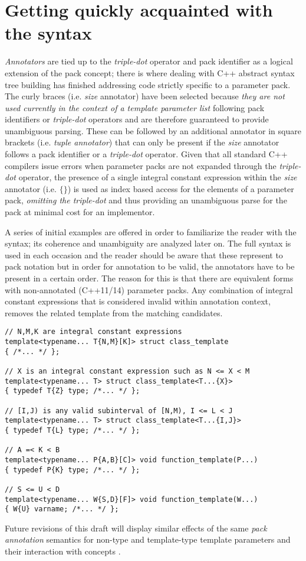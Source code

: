 \section{Getting quickly acquainted with the syntax}
\p \textit{Annotators} are tied up to the \textit{triple-dot} operator and pack identifier as a logical extension of the pack concept; there is where dealing with C++ abstract syntax tree building has finished addressing code strictly specific to a parameter pack.
The curly braces (i.e. \textit{size} annotator) have been selected because \textit{they are not used currently in the context of a template parameter list} following pack identifiers or \textit{triple-dot} operators and are therefore guaranteed to provide unambiguous parsing.
These can be followed by an additional annotator in square brackets (i.e. \textit{tuple annotator}) that can only be present if the \textit{size} annotator follows a pack identifier or a \textit{triple-dot} operator.
Given that all standard C++ compilers issue errors when parameter packs are not expanded through the \textit{triple-dot} operator, the presence of a single integral constant expression within the \textit{size} annotator (i.e. $\{\}$) is used as index based access for the elements of a parameter pack, \textit{omitting the triple-dot} and thus providing an unambiguous parse for the pack at minimal cost for an implementor.

\p A series of initial examples are offered in order to familiarize the reader with the syntax; its coherence and unambiguity are analyzed later on.
The full syntax is used in each occasion and the reader should be aware that these represent  to pack notation but in order for annotation to be valid, the annotators have to be present in a certain order.
The reason for this is that there are equivalent forms with non-annotated (C++11/14) parameter packs.
Any combination of integral constant expressions that is considered invalid within annotation context, removes the related template from the matching candidates.

\begin{verbatim}
// N,M,K are integral constant expressions
template<typename... T{N,M}[K]> struct class_template
{ /*... */ };

// X is an integral constant expression such as N <= X < M
template<typename... T> struct class_template<T...{X}>
{ typedef T{Z} type; /*... */ };

// [I,J) is any valid subinterval of [N,M), I <= L < J
template<typename... T> struct class_template<T...{I,J}>
{ typedef T{L} type; /*... */ };

// A =< K < B
template<typename... P{A,B}[C]> void function_template(P...)
{ typedef P{K} type; /*... */ };

// S <= U < D
template<typename... W{S,D}[F]> void function_template(W...)
{ W{U} varname; /*... */ };

\end{verbatim}

\p Future revisions of this draft will display similar effects of the same \textit{pack annotation} semantics for non-type and template-type template parameters and their interaction with concepts \cite{Stroustrup2012,Sutton2013}.
\newpage

